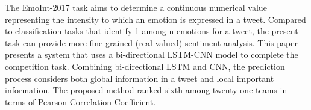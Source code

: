 The EmoInt-2017 task aims to determine a continuous numerical value representing the intensity to which an emotion is expressed in a tweet. Compared to classification tasks that identify 1 among n emotions for a tweet, the present task can provide more fine-grained (real-valued) sentiment analysis. This paper presents a system that uses a bi-directional LSTM-CNN model to complete the competition task. Combining bi-directional LSTM and CNN, the prediction process considers both global information in a tweet and local important information. The proposed method ranked sixth among twenty-one teams in terms of Pearson Correlation Coefficient.
